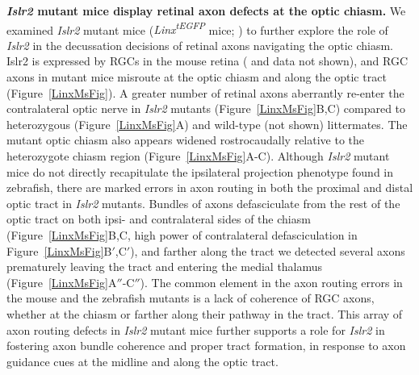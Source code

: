 \noindent\textbf{\emph{Islr2} mutant mice display retinal axon defects at the optic chiasm.}\newline
\indent We examined \emph{Islr2} mutant mice (\emph{Linx\textsuperscript{tEGFP}} mice; \cite{mandai2009lig}) to further explore the role of \emph{Islr2} in the decussation decisions of retinal axons navigating the optic chiasm.
Islr2 is expressed by RGCs in the mouse retina ( and data not shown), and RGC axons in mutant mice misroute at the optic chiasm and along the optic tract (Figure~\ref{LinxMsFig}).
A greater number of retinal axons aberrantly re-enter the contralateral optic nerve in \emph{Islr2} mutants (Figure~\ref{LinxMsFig}B,C) compared to heterozygous (Figure~\ref{LinxMsFig}A) and wild-type (not shown) littermates.
The mutant optic chiasm also appears widened rostrocaudally relative to the heterozygote chiasm region (Figure~\ref{LinxMsFig}A-C).
Although \emph{Islr2} mutant mice do not directly recapitulate the ipsilateral projection phenotype found in zebrafish, there are marked errors in axon routing in both the proximal and distal optic tract in \emph{Islr2} mutants.
Bundles of axons defasciculate from the rest of the optic tract on both ipsi- and contralateral sides of the chiasm (Figure~\ref{LinxMsFig}B,C, high power of contralateral defasciculation in Figure~\ref{LinxMsFig}B$'$,C$'$), and farther along the tract we detected several axons prematurely leaving the tract and entering the medial thalamus (Figure~\ref{LinxMsFig}A$''$-C$''$).
The common element in the axon routing errors in the mouse and the zebrafish mutants is a lack of coherence of RGC axons, whether at the chiasm or farther along their pathway in the tract.
This array of axon routing defects in \emph{Islr2} mutant mice further supports a role for \emph{Islr2} in fostering axon bundle coherence and proper tract formation, in response to axon guidance cues at the midline and along the optic tract.
